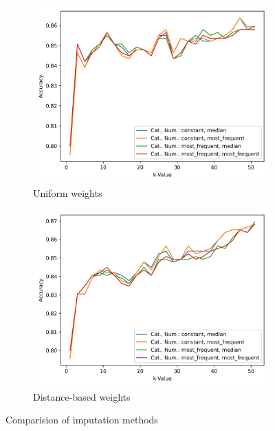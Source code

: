 \documentclass[a4paper,11pt]{article}
\begin{document}
        \begin{figure}[h!]
            \centering
            \begin{subfigure}[c]{0.45\textwidth}
                \centering
                \includegraphics[width=1\textwidth]{exercise_1/paper/figures/credit-approval-accuracy-kNN_uniform.png}
                \caption{Uniform weights}
                \label{fig:k-NN_credit-approval_uniform}
            \end{subfigure}
            \begin{subfigure}[c]{0.45\textwidth}
                \centering
                \includegraphics[width=1\textwidth]{exercise_1/paper/figures/credit-approval-accuracy-kNN_distance.png}
                \caption{Distance-based weights}
                \label{fig:k-NN_credit-approval_distance}
            \end{subfigure}
            \caption{Comparision of imputation methods}
            \label{fig:k-NN_credit-approval}
        \end{figure}
        
\end{document}
